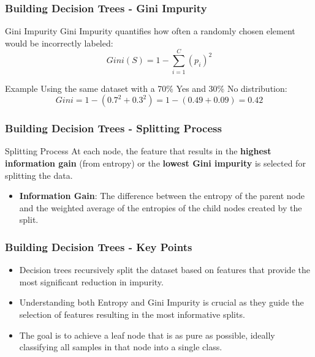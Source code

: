 \documentclass[aspectratio=169]{beamer}
\begin{document}
\begin{frame}[fragile]
    \frametitle{Building Decision Trees - Gini Impurity}
    \begin{block}{Gini Impurity}
        Gini Impurity quantifies how often a randomly chosen element would be incorrectly labeled:
        \begin{equation}
            Gini(S) = 1 - \sum_{i=1}^{C} (p_i)^2
        \end{equation}
    \end{block}
    \begin{block}{Example}
        Using the same dataset with a 70\% Yes and 30\% No distribution:
        \begin{equation}
            Gini = 1 - (0.7^2 + 0.3^2) = 1 - (0.49 + 0.09) = 0.42
        \end{equation}
    \end{block}
\end{frame}

\begin{frame}[fragile]
    \frametitle{Building Decision Trees - Splitting Process}
    \begin{block}{Splitting Process}
        At each node, the feature that results in the \textbf{highest information gain} (from entropy) 
        or the \textbf{lowest Gini impurity} is selected for splitting the data.
    \end{block}
    \begin{itemize}
        \item \textbf{Information Gain}: The difference between the entropy of the parent node 
        and the weighted average of the entropies of the child nodes created by the split.
    \end{itemize}
\end{frame}

\begin{frame}[fragile]
    \frametitle{Building Decision Trees - Key Points}
    \begin{itemize}
        \item Decision trees recursively split the dataset based on features that provide the most significant reduction in impurity.
        \item Understanding both Entropy and Gini Impurity is crucial as they guide the selection of features resulting in the most informative splits.
        \item The goal is to achieve a leaf node that is as pure as possible, ideally classifying all samples in that node into a single class.
    \end{itemize}
\end{frame}
\end{document}

